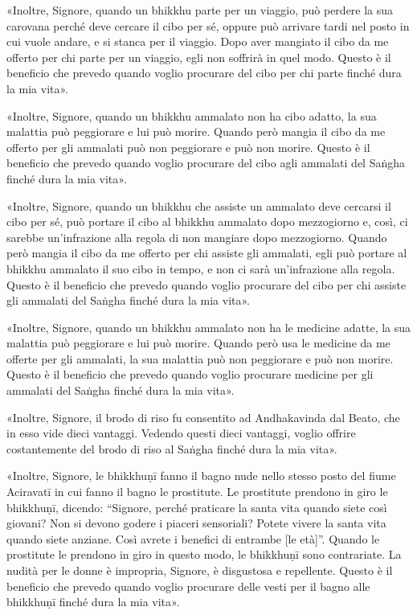 «Inoltre, Signore, quando un bhikkhu parte per un viaggio, può perdere la sua
carovana perché deve cercare il cibo per sé, oppure può arrivare tardi nel posto
in cui vuole andare, e si stanca per il viaggio. Dopo aver mangiato il cibo da
me offerto per chi parte per un viaggio, egli non soffrirà in quel modo. Questo
è il beneficio che prevedo quando voglio procurare del cibo per chi parte finché
dura la mia vita».

«Inoltre, Signore, quando un bhikkhu ammalato non ha cibo adatto, la sua
malattia può peggiorare e lui può morire. Quando però mangia il cibo da me
offerto per gli ammalati può non peggiorare e può non morire. Questo è il
beneficio che prevedo quando voglio procurare del cibo agli ammalati del Saṅgha
finché dura la mia vita».

«Inoltre, Signore, quando un bhikkhu che assiste un ammalato deve cercarsi il
cibo per sé, può portare il cibo al bhikkhu ammalato dopo mezzogiorno e, così,
ci sarebbe un’infrazione alla regola di non mangiare dopo mezzogiorno. Quando
però mangia il cibo da me offerto per chi assiste gli ammalati, egli può portare
al bhikkhu ammalato il suo cibo in tempo, e non ci sarà un’infrazione alla
regola. Questo è il beneficio che prevedo quando voglio procurare del cibo per
chi assiste gli ammalati del Saṅgha finché dura la mia vita».

«Inoltre, Signore, quando un bhikkhu ammalato non ha le medicine adatte, la sua
malattia può peggiorare e lui può morire. Quando però usa le medicine da me
offerte per gli ammalati, la sua malattia può non peggiorare e può non morire.
Questo è il beneficio che prevedo quando voglio procurare medicine per gli
ammalati del Saṅgha finché dura la mia vita».

«Inoltre, Signore, il brodo di riso fu consentito ad Andhakavinda dal Beato, che
in esso vide dieci vantaggi. Vedendo questi dieci vantaggi, voglio offrire
costantemente del brodo di riso al Saṅgha finché dura la mia vita».

«Inoltre, Signore, le bhikkhuṇī fanno il bagno nude nello stesso posto del fiume
Aciravatī in cui fanno il bagno le prostitute. Le prostitute prendono in giro le
bhikkhuṇī, dicendo: “Signore, perché praticare la santa vita quando siete così
giovani? Non si devono godere i piaceri sensoriali? Potete vivere la santa vita
quando siete anziane. Così avrete i benefici di entrambe [le età]”. Quando le
prostitute le prendono in giro in questo modo, le bhikkhuṇī sono contrariate. La
nudità per le donne è impropria, Signore, è disgustosa e repellente. Questo è il
beneficio che prevedo quando voglio procurare delle vesti per il bagno alle
bhikkhuṇī finché dura la mia vita».

